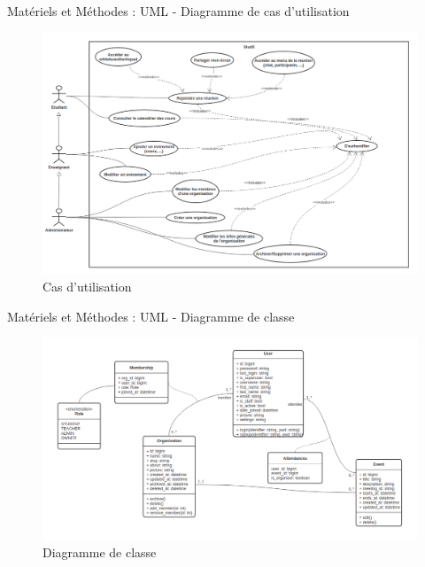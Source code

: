 \documentclass{beamer}
\begin{document}
\begin{frame}{Matériels et Méthodes : \small{UML} - \footnotesize{Diagramme de cas d'utilisation}}
  \begin{figure}[H]
    \centering
    \includegraphics[width=\textwidth]{../../images/use-cases-diag.png}
    \caption{Cas d'utilisation}
\end{figure}

\end{frame}

\begin{frame}{Matériels et Méthodes : \small{UML} - \footnotesize{Diagramme de classe}}
  \begin{figure}[H]
    \centering
    \includegraphics[width=\textwidth]{../../images/class-diag.png}
    \caption{Diagramme de classe}
\end{figure}
\end{frame}
\end{document}
